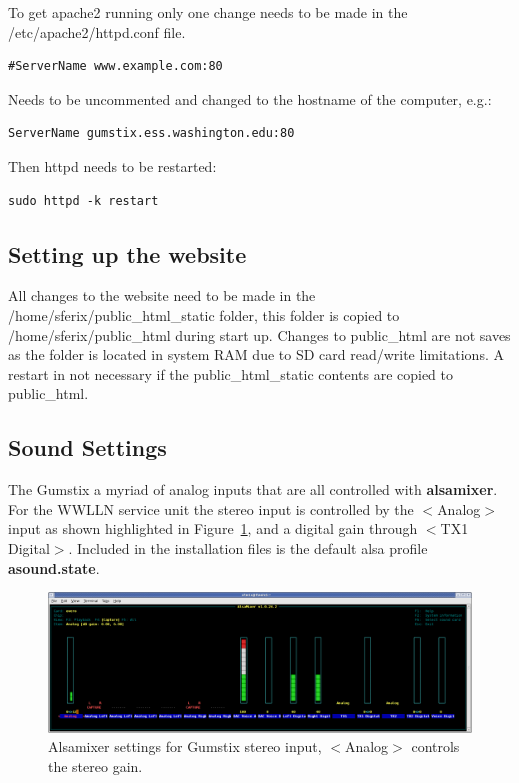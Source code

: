 To get apache2 running only one change needs to be made in the /etc/apache2/httpd.conf file.

\begin{verbatim}
#ServerName www.example.com:80
\end{verbatim}

Needs to be uncommented and changed to the hostname of the computer, e.g.:

\begin{verbatim}
ServerName gumstix.ess.washington.edu:80
\end{verbatim}

Then httpd needs to be restarted:

\begin{verbatim}
sudo httpd -k restart
\end{verbatim}

\subsection*{Setting up the website}

All changes to the website need to be made in the /home/sferix/public\_html\_static folder, this folder is copied to /home/sferix/public\_html during start up. Changes to public\_html are not saves as the folder is located in system RAM due to SD card read/write limitations. A restart in not necessary if the public\_html\_static contents are copied to public\_html.

\subsection{Sound Settings}

The Gumstix a myriad of analog inputs that are all controlled with {\bf alsamixer}.
For the WWLLN service unit the stereo input is controlled by the $<$Analog$>$ input as shown highlighted in Figure~\ref{app:gumstix:fig:alsa}, and a digital gain through $<$TX1 Digital$>$.
Included in the installation files is the default alsa profile {\bf asound.state}.

\begin{figure}[ht!]
   \centering
   \includegraphics[scale=.25]{Appendix/Figures/gumstixmixer.png}
   \caption{Alsamixer settings for Gumstix stereo input, $<$Analog$>$ controls the stereo gain.}
   \label{app:gumstix:fig:alsa}
\end{figure}

